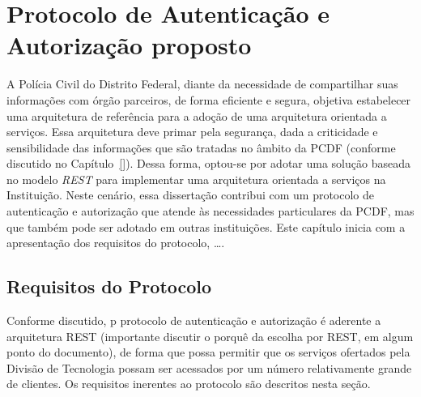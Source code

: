 \chapter{Protocolo de Autenticação e Autorização proposto}\label{cap:Protocolo}



A Polícia Civil do Distrito Federal, diante da necessidade de compartilhar suas informações com órgão parceiros, de forma eficiente e segura, 
objetiva estabelecer uma arquitetura de referência para a adoção de uma arquitetura orientada a servi\c cos. Essa arquitetura deve primar pela segurança, 
dada a criticidade e sensibilidade das informações que são tratadas no âmbito da PCDF ({\color{red}conforme discutido no Cap\'{i}tulo~\ref{}}).
Dessa forma, optou-se por adotar uma solu\c c\~{a}o {\color{red}baseada no modelo \emph{REST}} para implementar uma arquitetura orientada a servi\c cos 
na Instituição. Neste cen\'{a}rio, essa disserta\c c\~{a}o contribui com um protocolo de autenticação e autorização que atende às 
necessidades particulares da PCDF, mas que tamb\'{e}m pode ser adotado em outras institui\c c\~{o}es. {\color{red}Este cap\'{i}tulo inicia com a apresenta\c c\~{a}o 
dos requisitos do protocolo, \ldots}.

\section{Requisitos do Protocolo}\label{sec:reqprotocolo}

Conforme discutido, p protocolo de autenticação e autorização \'{e} aderente a arquitetura REST ({\color{blue}importante discutir o porqu\^{e} da escolha por REST, em algum ponto do documento}), de forma que possa permitir que os serviços ofertados pela Divisão de Tecnologia possam ser acessados por um número relativamente grande de clientes. Os requisitos inerentes ao protocolo são descritos nesta seção.

